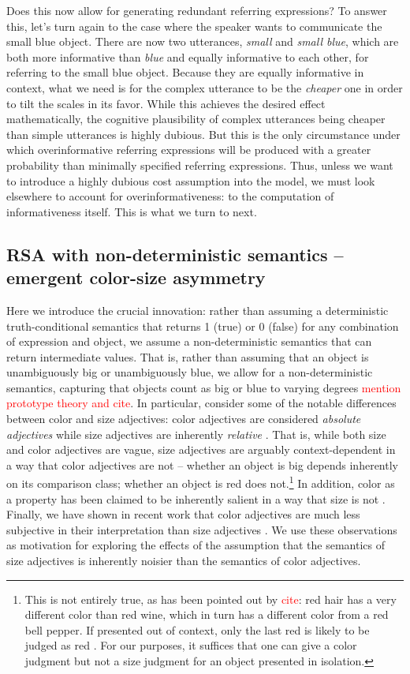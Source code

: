 \documentclass[11pt]{article}
\newcommand{\red}[1]{\textcolor{Red}{#1}}
\begin{document}
Does this now allow for generating redundant referring expressions? To answer this, let's turn again to the case where the speaker wants to communicate the small blue object. There are now two  utterances, \emph{small} and \emph{small blue}, which are both more informative than \emph{blue} and equally informative to each other, for referring to the small blue object. Because they are equally informative in context, what we need is for the complex utterance to be the \emph{cheaper} one in order to tilt the scales in its favor. While this achieves the desired effect mathematically, the cognitive plausibility of complex utterances being cheaper than simple utterances is highly dubious. But this is the only circumstance under which overinformative referring expressions will be produced with a greater probability than minimally specified referring expressions. Thus, unless we want to introduce a highly dubious cost assumption into the model, we must look elsewhere to account for overinformativeness: to the computation of informativeness itself. This is what we turn to next.

\subsection{RSA with non-deterministic semantics -- emergent color-size asymmetry}
\label{sec:modifiedmodel}

Here we introduce the crucial innovation: rather than assuming a deterministic truth-conditional semantics that returns 1 (true) or 0 (false) for any combination of expression and object, we assume a non-deterministic semantics that can return intermediate values. That is, rather than assuming that an object is unambiguously big or unambiguously blue, we allow for a non-deterministic semantics, capturing that objects count as big or blue to  varying degrees \red{mention prototype theory and cite}. In particular, consider some of the notable differences between color and size adjectives: color adjectives are considered  \emph{absolute adjectives} while size adjectives are inherently \emph{relative} \cite{kennedymcnally2005}. That is, while both size and color adjectives are vague, size adjectives are arguably context-dependent in a way that color adjectives are not -- whether an object is big depends inherently on its comparison class; whether an object is red does not.\footnote{This is not entirely true, as has been pointed out by \red{cite}: red hair has a very different color than red wine, which in turn has a different color from a red bell pepper. If presented out of context, only the last red is likely to be judged as red \cite{is there a ref?}. For our purposes, it suffices that one can give a color judgment but not a size judgment for an object presented in isolation.} In addition, color as a property has been claimed to be inherently salient in a way that size is not \cite{arts2011,gattetal2013}. Finally, we have shown in recent work that color adjectives are much less subjective in their interpretation than size adjectives \cite{scontrasunderreview}. We use these observations as motivation for exploring the effects of the assumption that the semantics of size adjectives is inherently noisier than the semantics of color adjectives.
\end{document}
